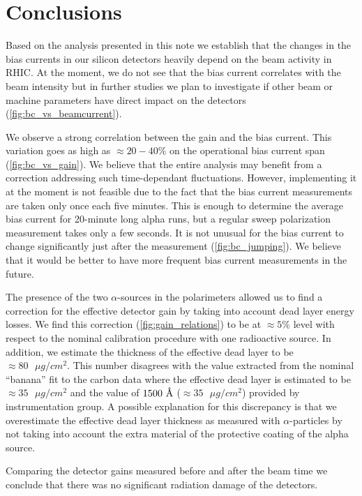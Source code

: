 \documentclass[a4paper,12pt]{article}
\newcommand{\angstrom}{\mbox{\normalfont\AA}}
\begin{document}
\section{Conclusions}

Based on the analysis presented in this note we establish that the changes in
the bias currents in our silicon detectors heavily depend on the beam activity
in RHIC. At the moment, we do not see that the bias current correlates with
the beam intensity but in further studies we plan to investigate if other beam
or machine parameters have direct impact on the detectors (\cref{fig:bc_vs_beamcurrent}).

We observe a strong correlation between the gain and the bias current.
This variation goes as high as $\approx 20-40\%$ on the operational bias current
span (\cref{fig:bc_vs_gain}). We believe that the entire analysis
may benefit from a correction addressing such time-dependant fluctuations.
However, implementing it at the moment is not feasible due to
the fact that the bias current measurements are taken only once each five minutes.
This is enough to determine the average bias current for 20-minute long alpha runs, but
a regular sweep polarization measurement takes only a few seconds. It is not
unusual for the bias current to change significantly just after the measurement (\cref{fig:bc_jumping}).
We believe that it would be better to have more frequent bias current measurements in the future.

The presence of the two $\alpha$-sources in the polarimeters allowed us to find
a correction for the effective detector gain by taking into account dead layer
energy losses. We find this correction (\cref{fig:gain_relations}) to be at $\approx 5\%$ level
with respect to the nominal calibration procedure with one radioactive source.
In addition, we estimate the thickness of the effective dead layer to be
$\approx 80\text{ }\mu g/cm^2$. This number disagrees with the value extracted
from the nominal ``banana'' fit to the carbon data where the effective dead layer is
estimated to be $\approx 35\text{ }\mu g/cm^2$ and the value of $1500\text{ }\angstrom$
($\approx 35\text{ }\mu g/cm^2$) provided by instrumentation group.
A possible explanation for this discrepancy
is that we overestimate the effective dead layer thickness as measured with
$\alpha$-particles by not taking into account the extra material of the protective
coating of the alpha source.

Comparing the detector gains measured before and after the beam time we conclude
that there was no significant radiation damage of the detectors.
\end{document}
